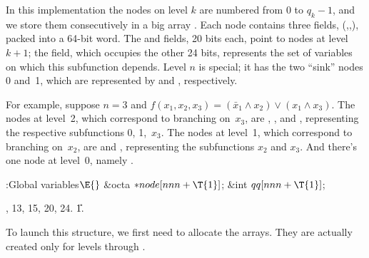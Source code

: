 In this implementation the nodes on level $k$ are numbered from 0 to
$q_k-1$, and we store them consecutively in a big array .
Each node contains three fields, (,,), packed
into a
64-bit word. The  and  fields, 20 bits each, point to
nodes
at level~$k+1$; the  field, which occupies the other 24 bits,
represents the set of variables on which this subfunction depends.
Level $n$ is special; it has the two ``sink'' nodes 0 and~1,
which are represented by  and , respectively.

For example, suppose $n=3$ and $f(x_1,x_2,x_3)=(\bar x_1\land x_2)
\lor(x_1\land x_3)$. The nodes at level~2, which correspond to
branching on~$x_3$, are
,
, and
, representing the
respective subfunctions 0, 1,~$x_3$.
The nodes at level~1, which correspond to branching on~$x_2$, are
 and
, representing the
subfunctions $x_2$ and $x_3$.
And there's one node at level~0, namely
.

\Y\B\4:Global variables\X${}\E{}$\6
\&{octa} ${}{*}\\{node}[\\{nnn}+\T{1}]{}$;\6
\&{int} ${}\\{qq}[\\{nnn}+\T{1}]{}$;\par
{}, 13, 15, 20, 24.
\U1.\fi

To launch this structure, we first need to allocate the  arrays.
They are actually created only for levels  through .

